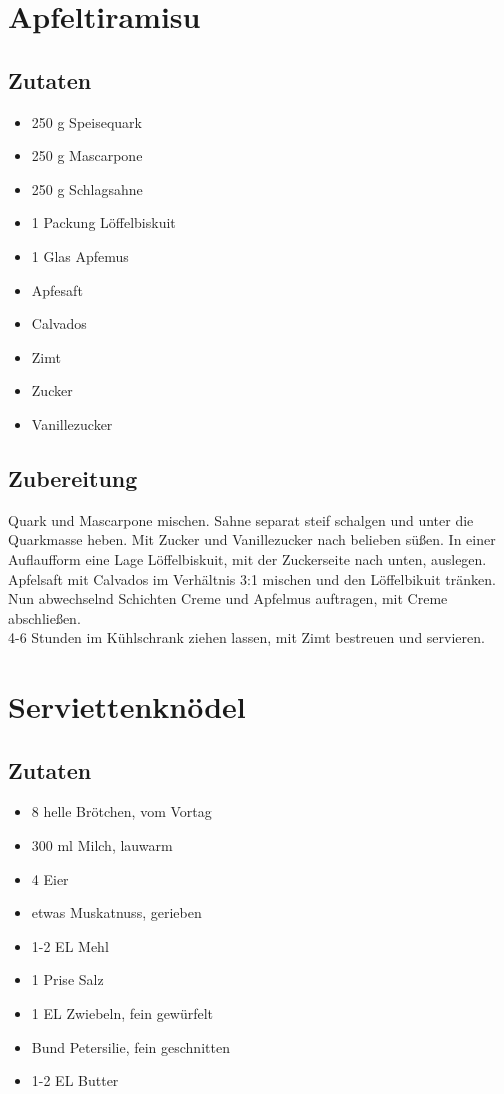 \documentclass{article}
\begin{document}
\clearpage
\section{Apfeltiramisu} %
\label{sec:apfeltiramisu}
\subsection*{Zutaten} %
\label{sub:apfeltiramisu:zutaten}
	\begin{itemize}
		\item 250 g Speisequark
		\item 250 g Mascarpone
		\item 250 g Schlagsahne
    \item 1 Packung Löffelbiskuit
    \item 1 Glas Apfemus
    \item Apfesaft
    \item Calvados
    \item Zimt
    \item Zucker
    \item Vanillezucker
	\end{itemize}
  \subsection*{Zubereitung}
  \label{sub:apfeltiramisu:zubereitung}
  Quark und Mascarpone mischen. Sahne separat steif schalgen und
  unter die Quarkmasse heben. Mit Zucker und Vanillezucker nach
  belieben süßen.
  In einer Auflaufform eine Lage Löffelbiskuit,
  mit der Zuckerseite nach unten, auslegen.
  Apfelsaft mit Calvados im Verhältnis 3:1 mischen
  und den Löffelbikuit tränken.
  Nun abwechselnd Schichten Creme und Apfelmus auftragen,
  mit Creme abschließen.\\
  4-6 Stunden im Kühlschrank ziehen lassen,
  mit Zimt bestreuen und servieren.

\clearpage
\section{Serviettenknödel} %
\label{sec:serviettenknoedel}
\subsection*{Zutaten} %
\label{sub:serviettenknoedel:zutaten}
	\begin{itemize}
		\item 8 helle Brötchen, vom Vortag
		\item 300 ml Milch, lauwarm
		\item 4 Eier
		\item etwas Muskatnuss, gerieben
		\item 1-2 EL Mehl
		\item 1 Prise Salz
		\item 1 EL Zwiebeln, fein gewürfelt
		\item \textonehalf Bund Petersilie, fein geschnitten
		\item 1-2 EL Butter
	\end{itemize}
\end{document}
